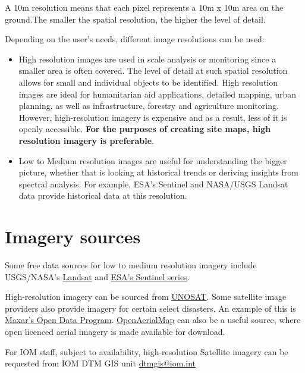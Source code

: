 \documentclass[
  a4paper,
  onecolumn,
  oneside]{book}
\begin{document}
A 10m resolution means that each pixel represents a 10m x 10m area on
the ground.The smaller the spatial resolution, the higher the level of
detail.

Depending on the user's needs, different image resolutions can be used:

\begin{itemize}
\item
  High resolution images are used in scale analysis or monitoring since
  a smaller area is often covered. The level of detail at such spatial
  resolution allows for small and individual objects to be identified.
  High resolution images are ideal for humanitarian aid applications,
  detailed mapping, urban planning, as well as infrastructure, forestry
  and agriculture monitoring. However, high-resolution imagery is
  expensive and as a result, less of it is openly accessible.
  \textbf{For the purposes of creating site maps, high resolution
  imagery is preferable}.
\item
  Low to Medium resolution images are useful for understanding the
  bigger picture, whether that is looking at historical trends or
  deriving insights from spectral analysis. For example, ESA's Sentinel
  and NASA/USGS Landsat data provide historical data at this resolution.
\end{itemize}

\hypertarget{imagery-sources}{%
\section{Imagery sources}\label{imagery-sources}}

Some free data sources for low to medium resolution imagery include
USGS/NASA's \href{https://earthexplorer.usgs.gov/}{Landsat} and
\href{https://apps.sentinel-hub.com/eo-browser/}{ESA's Sentinel series}.

High-resolution imagery can be sourced from
\href{https://smcs.unosat.org/home}{UNOSAT}. Some satellite image
providers also provide imagery for certain select disasters. An example
of this is \href{https://www.maxar.com/open-data}{Maxar's Open Data
Program}. \href{https://openaerialmap.org/}{OpenAerialMap} can also be a
useful source, where open licenced aerial imagery is made available for
download.

\begin{tcolorbox}[enhanced jigsaw, opacitybacktitle=0.6, colbacktitle=quarto-callout-note-color!10!white, breakable, coltitle=black, title=\textcolor{quarto-callout-note-color}{\faInfo}\hspace{0.5em}{Note for IOM staff}, toprule=.15mm, bottomrule=.15mm, colback=white, left=2mm, toptitle=1mm, bottomtitle=1mm, arc=.35mm, colframe=quarto-callout-note-color-frame, titlerule=0mm, opacityback=0, rightrule=.15mm, leftrule=.75mm]

For IOM staff, subject to availability, high-resolution Satellite
imagery can be requested from IOM DTM GIS unit \url{dtmgis@iom.int}

\end{tcolorbox}
\end{document}
